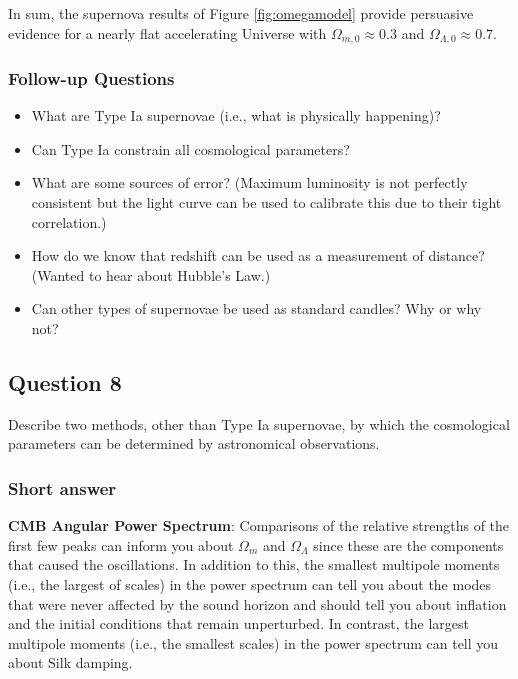 \documentclass[a4paper,11pt]{article}
\begin{document}
{\noindent}In sum, the supernova results of Figure \ref{fig:omegamodel} provide persuasive evidence for a nearly flat accelerating Universe with $\Omega_{m,0}\approx0.3$ and $\Omega_{\Lambda,0}\approx0.7$.

\subsubsection{Follow-up Questions}

\begin{itemize}
    \item What are Type Ia supernovae (i.e., what is physically happening)?
    \item Can Type Ia constrain all cosmological parameters?
    \item What are some sources of error? (Maximum luminosity is not perfectly consistent but the light curve can be used to calibrate this due to their tight correlation.)
    \item How do we know that redshift can be used as a measurement of distance? (Wanted to hear about Hubble's Law.)
    \item Can other types of supernovae be used as standard candles? Why or why not?
\end{itemize}

%
%

\newpage
\subsection{Question 8}

Describe two methods, other than Type Ia supernovae, by which the cosmological parameters can be determined by astronomical observations.

\subsubsection{Short answer}

\textbf{CMB Angular Power Spectrum}: Comparisons of the relative strengths of the first few peaks can inform you about $\Omega_m$ and $\Omega_\Lambda$ since these are the components that caused the oscillations. In addition to this, the smallest multipole moments (i.e., the largest of scales) in the power spectrum can tell you about the modes that were never affected by the sound horizon and should tell you about inflation and the initial conditions that remain unperturbed. In contrast, the largest multipole moments (i.e., the smallest scales) in the power spectrum can tell you about Silk damping.
\end{document}
